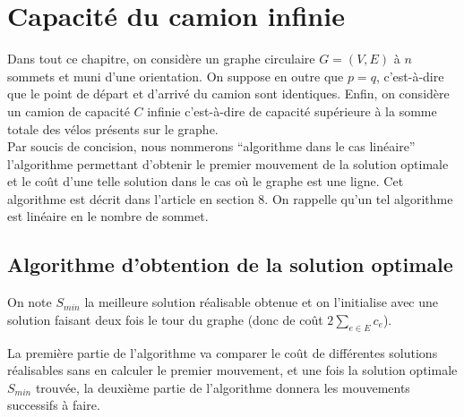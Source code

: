 \chapter{Capacité du camion infinie}
\label{Capacité infinie}

Dans tout ce chapitre, on considère un graphe circulaire $G = (V,E)$ à $n$ sommets et muni d'une orientation. On suppose en outre que $p=q$, c'est-à-dire que le point de départ et d'arrivé du camion sont identiques. Enfin, on considère un camion de capacité $C$ infinie c'est-à-dire de capacité supérieure à la somme totale des vélos présents sur le graphe.
\\

Par soucis de concision, nous nommerons ``algorithme dans le cas linéaire'' l'algorithme permettant d'obtenir le premier mouvement de la solution optimale et le coût d'une telle solution dans le cas où le graphe est une ligne. Cet algorithme est décrit dans l'article \cite{Benchimol2011} en section 8. On rappelle qu'un tel algorithme est linéaire en le nombre de sommet.

\section{Algorithme d'obtention de la solution optimale}
\label{Algorithme circulaire infini}

On note $S_{min}$ la meilleure solution réalisable obtenue et on l'initialise avec une solution faisant deux fois le tour du graphe (donc de coût $2\sum_{e \in E}c_e$).

La première partie de l'algorithme va comparer le coût de différentes solutions réalisables sans en calculer le premier mouvement, et une fois la solution optimale $S_{min}$ trouvée, la deuxième partie de l'algorithme donnera les mouvements successifs à faire.
\\

